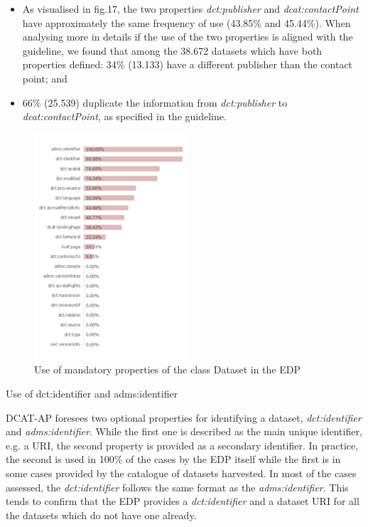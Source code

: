 \documentclass[<options>]{elsarticle}
\begin{document}
\begin{itemize}
\item As visualised in fig.17, the two properties \textit{dct:publisher} and \textit{dcat:contactPoint} have approximately the same frequency of use (43.85\% and 45.44\%). When analysing more in details if the use of the two properties is aligned with the guideline, we found that among the 38.672 datasets which have both properties defined: 34\% (13.133) have a different publisher than the contact point; and
\item 66\% (25.539) duplicate the information from \textit{dct:publisher} to \textit{dcat:contactPoint}, as specified in the guideline.
\end{itemize}

\begin{figure}[!h]
\includegraphics{replace21.png}
\caption{Use of mandatory properties of the class Dataset in the EDP}
\end{figure}

Use of dct:identifier and adms:identifier

DCAT-AP foresees two optional properties for identifying a dataset, \textit{dct:identifier} and \textit{adms:identifier}. While the first one is described as the main unique identifier, e.g. a URI, the second property is provided as a secondary identifier. In practice, the second is used in 100\% of the cases by the EDP itself while the first is in some cases provided by the catalogue of datasets harvested. In most of the cases assessed, the \textit{dct:identifier} follows the same format as the \textit{adms:identifier}. This tends to confirm that the EDP provides a \textit{dct:identifier }and a dataset URI for all the datasets which do not have one already.
\end{document}
